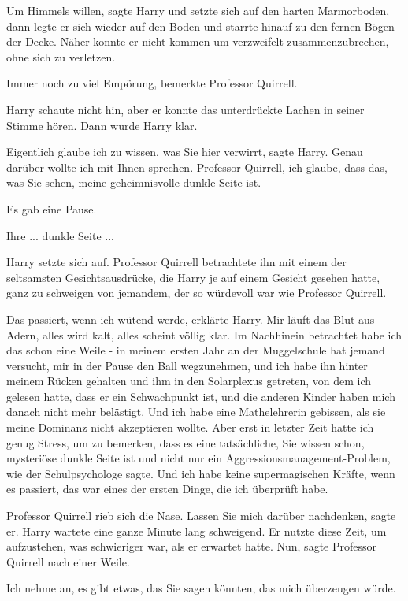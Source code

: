 \glqq{}Um Himmels willen\grqq{}, sagte Harry und setzte sich auf den harten
Marmorboden, dann legte er sich wieder auf den Boden und starrte hinauf zu den
fernen Bögen der Decke. Näher konnte er nicht kommen um verzweifelt
zusammenzubrechen, ohne sich zu verletzen.

\glqq{}Immer noch zu viel Empörung\grqq{}, bemerkte Professor Quirrell.

Harry schaute nicht hin, aber er konnte das unterdrückte Lachen in seiner Stimme
hören. Dann wurde Harry klar.

\glqq{}Eigentlich glaube ich zu wissen, was Sie hier verwirrt\grqq{}, sagte
Harry. \glqq{}Genau darüber wollte ich mit Ihnen sprechen. Professor Quirrell,
ich glaube, dass das, was Sie sehen, meine geheimnisvolle dunkle Seite
ist.\grqq{}

Es gab eine Pause.

\glqq{}Ihre ... dunkle Seite ...\grqq{}

Harry setzte sich auf. Professor Quirrell betrachtete ihn mit einem der
seltsamsten Gesichtsausdrücke, die Harry je auf einem Gesicht gesehen hatte,
ganz zu schweigen von jemandem, der so würdevoll war wie Professor Quirrell.

\glqq{}Das passiert, wenn ich wütend werde\grqq{}, erklärte Harry. \glqq{}Mir
läuft das Blut aus Adern, alles wird kalt, alles scheint völlig klar. Im
Nachhinein betrachtet habe ich das schon eine Weile - in meinem ersten Jahr an
der Muggelschule hat jemand versucht, mir in der Pause den Ball wegzunehmen, und
ich habe ihn hinter meinem Rücken gehalten und ihm in den Solarplexus getreten,
von dem ich gelesen hatte, dass er ein Schwachpunkt ist, und die anderen Kinder
haben mich danach nicht mehr belästigt. Und ich habe eine Mathelehrerin
gebissen, als sie meine Dominanz nicht akzeptieren wollte. Aber erst in letzter
Zeit hatte ich genug Stress, um zu bemerken, dass es eine tatsächliche, Sie
wissen schon, mysteriöse dunkle Seite ist und nicht nur ein
Aggressionsmanagement-Problem, wie der Schulpsychologe sagte. Und ich habe keine
supermagischen Kräfte, wenn es passiert, das war eines der ersten Dinge, die ich
überprüft habe.\grqq{}

Professor Quirrell rieb sich die Nase. \glqq{}Lassen Sie mich darüber
nachdenken\grqq{}, sagte er. Harry wartete eine ganze Minute lang schweigend. Er
nutzte diese Zeit, um aufzustehen, was schwieriger war, als er erwartet hatte.
\glqq{}Nun\grqq{}, sagte Professor Quirrell nach einer Weile.

\glqq{}Ich nehme an, es gibt etwas, das Sie sagen könnten, das mich überzeugen
würde.\grqq{}

